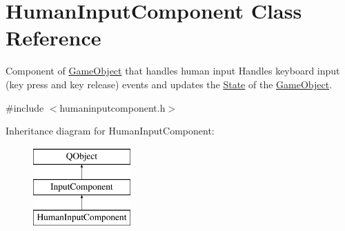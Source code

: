 \hypertarget{classHumanInputComponent}{\section{Human\-Input\-Component Class Reference}
\label{classHumanInputComponent}
}


Component of \hyperlink{classGameObject}{Game\-Object} that handles human input Handles keyboard input (key press and key release) events and updates the \hyperlink{classState}{State} of the \hyperlink{classGameObject}{Game\-Object}.  




{\ttfamily \#include $<$humaninputcomponent.\-h$>$}

Inheritance diagram for Human\-Input\-Component\-:\begin{figure}[H]
\begin{center}
\leavevmode
\includegraphics[height=3.000000cm]{classHumanInputComponent}
\end{center}
\end{figure}
